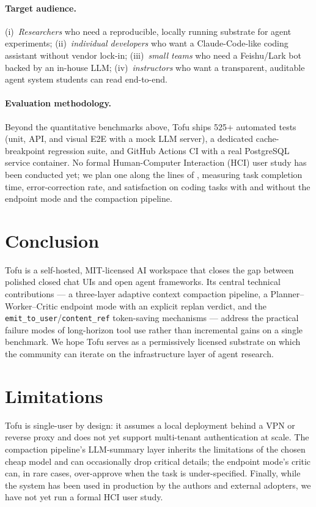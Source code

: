 \documentclass[11pt]{article}
\begin{document}
\paragraph{Target audience.}
(i)~\emph{Researchers} who need a reproducible, locally running
substrate for agent experiments; (ii)~\emph{individual developers} who
want a Claude-Code-like coding assistant without vendor lock-in;
(iii)~\emph{small teams} who need a Feishu/Lark bot backed by an
in-house LLM; (iv)~\emph{instructors} who want a transparent, auditable
agent system students can read end-to-end.

\paragraph{Evaluation methodology.}
Beyond the quantitative benchmarks above, Tofu ships 525+ automated
tests (unit, API, and visual E2E with a mock LLM server), a dedicated
cache-breakpoint regression suite, and GitHub Actions CI with a real
PostgreSQL service container. No formal Human-Computer Interaction
(HCI) user study has been conducted yet; we plan one along the lines of
\citet{ResearStudio}, measuring task completion time, error-correction
rate, and satisfaction on coding tasks with and without the endpoint
mode and the compaction pipeline.

\section{Conclusion}

Tofu is a self-hosted, MIT-licensed AI workspace that closes the gap
between polished closed chat UIs and open agent frameworks. Its central
technical contributions --- a three-layer adaptive context compaction
pipeline, a Planner--Worker--Critic endpoint mode with an explicit
replan verdict, and the \texttt{emit\_to\_user}/\texttt{content\_ref}
token-saving mechanisms --- address the practical failure modes of
long-horizon tool use rather than incremental gains on a single
benchmark. We hope Tofu serves as a permissively licensed substrate on
which the community can iterate on the infrastructure layer of agent
research.

\section*{Limitations}

Tofu is single-user by design: it assumes a local deployment behind a
VPN or reverse proxy and does not yet support multi-tenant
authentication at scale. The compaction pipeline's LLM-summary layer
inherits the limitations of the chosen cheap model and can occasionally
drop critical details; the endpoint mode's critic can, in rare cases,
over-approve when the task is under-specified. Finally, while the
system has been used in production by the authors and external
adopters, we have not yet run a formal HCI user study.
\end{document}

